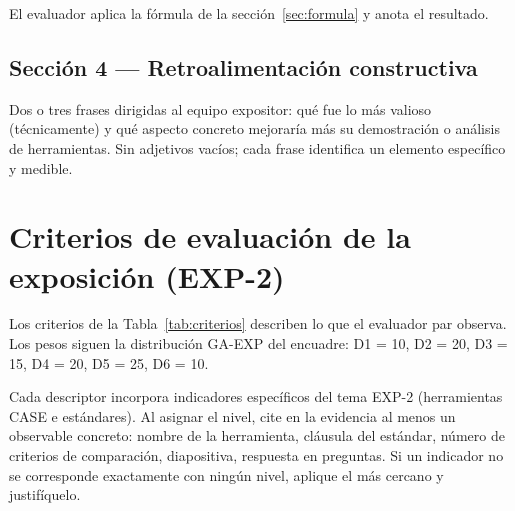 \documentclass[11pt]{article}
\begin{document}
El evaluador aplica la fórmula de la sección~\ref{sec:formula} y anota el resultado.

\subsection{\textcolor{midblue}{Sección 4 --- Retroalimentación constructiva}}

Dos o tres frases dirigidas al equipo expositor: qué fue lo más valioso (técnicamente) y qué aspecto concreto mejoraría más su demostración o análisis de herramientas. Sin adjetivos vacíos; cada frase identifica un elemento específico y medible.

\section{\textcolor{utegreendk}{Criterios de evaluación de la exposición (EXP-2)}}

Los criterios de la Tabla~\ref{tab:criterios} describen lo que el evaluador par observa. Los pesos siguen la distribución GA-EXP del encuadre: D1 = 10, D2 = 20, D3 = 15, D4 = 20, D5 = 25, D6 = 10.

\begin{cajaaviso}[title=Indicadores observables y medibles]
	Cada descriptor incorpora indicadores específicos del tema EXP-2 (herramientas CASE e estándares). Al asignar el nivel, cite en la evidencia al menos un observable concreto: nombre de la herramienta, cláusula del estándar, número de criterios de comparación, diapositiva, respuesta en preguntas. Si un indicador no se corresponde exactamente con ningún nivel, aplique el más cercano y justifíquelo.
\end{cajaaviso}
\end{document}
